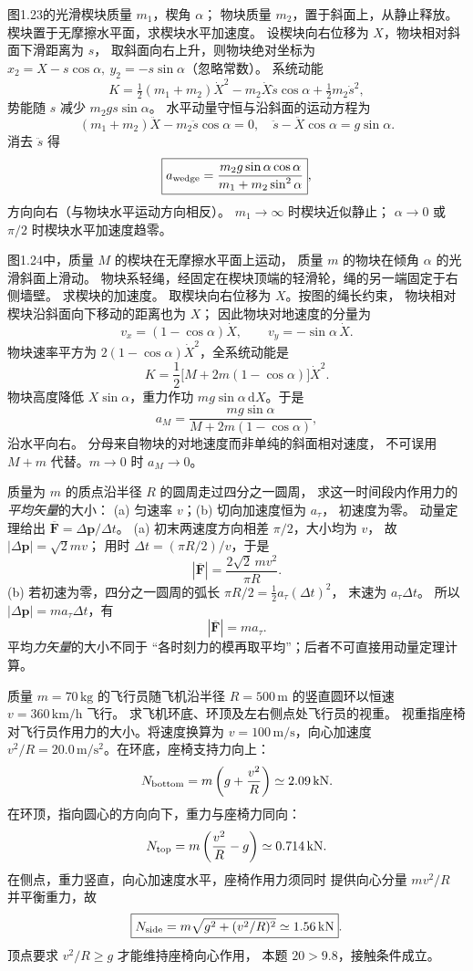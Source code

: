 图1.23的光滑楔块质量 $m_1$，楔角 $\alpha$；
物块质量 $m_2$，置于斜面上，从静止释放。
楔块置于无摩擦水平面，求楔块水平加速度。
\exsolution
设楔块向右位移为 $X$，物块相对斜面下滑距离为 $s$，
取斜面向右上升，则物块绝对坐标为
$x_2=X-s\cos\alpha,\ y_2=-s\sin\alpha$（忽略常数）。
系统动能
\[
K=\tfrac12(m_1+m_2)\dot X^2
-m_2\dot X\dot s\cos\alpha+\tfrac12m_2\dot s^2,
\]
势能随 $s$ 减少 $m_2gs\sin\alpha$。
水平动量守恒与沿斜面的运动方程为
\[
(m_1+m_2)\ddot X-m_2\ddot s\cos\alpha=0,\quad
\ddot s-\ddot X\cos\alpha=g\sin\alpha.
\]
消去 $\ddot s$ 得
\[
\boxed{a_{\rm wedge}=
\frac{m_2g\sin\alpha\cos\alpha}
{m_1+m_2\sin^2\alpha}},
\]
方向向右（与物块水平运动方向相反）。
\excheck $m_1\to\infty$ 时楔块近似静止；
$\alpha\to0$ 或 $\pi/2$ 时楔块水平加速度趋零。

图1.24中，质量 $M$ 的楔块在无摩擦水平面上运动，
质量 $m$ 的物块在倾角 $\alpha$ 的光滑斜面上滑动。
物块系轻绳，经固定在楔块顶端的轻滑轮，绳的另一端固定于右侧墙壁。
求楔块的加速度。
\exsolution
取楔块向右位移为 $X$。按图的绳长约束，
物块相对楔块沿斜面向下移动的距离也为 $X$；
因此物块对地速度的分量为
\[
v_x=(1-\cos\alpha)\dot X,\qquad
v_y=-\sin\alpha\,\dot X.
\]
物块速率平方为
$2(1-\cos\alpha)\dot X^2$，全系统动能是
\[
K=\frac12\bigl[M+2m(1-\cos\alpha)\bigr]\dot X^2.
\]
物块高度降低 $X\sin\alpha$，重力作功
$mg\sin\alpha\,\mathrm dX$。于是
\[
\boxed{a_M=
\frac{mg\sin\alpha}
{M+2m(1-\cos\alpha)}},
\]
沿水平向右。
\excheck 分母来自物块的对地速度而非单纯的斜面相对速度，
不可误用 $M+m$ 代替。$m\to0$ 时 $a_M\to0$。

质量为 $m$ 的质点沿半径 $R$ 的圆周走过四分之一圆周，
求这一时间段内作用力的\emph{平均矢量}的大小：
(a) 匀速率 $v$；(b) 切向加速度恒为 $a_\tau$，
初速度为零。
\exsolution
动量定理给出 $\overline{\bm F}=\Delta\bm p/\Delta t$。
(a) 初末两速度方向相差 $\pi/2$，大小均为 $v$，
故 $|\Delta\bm p|=\sqrt2mv$；
用时 $\Delta t=(\pi R/2)/v$，于是
\[
\boxed{|\overline{\bm F}|=\frac{2\sqrt2\,mv^2}{\pi R}}.
\]
(b) 若初速为零，四分之一圆周的弧长
$\pi R/2=\tfrac12a_\tau(\Delta t)^2$，
末速为 $a_\tau\Delta t$。
所以 $|\Delta\bm p|=ma_\tau\Delta t$，有
\[
\boxed{|\overline{\bm F}|=ma_\tau}.
\]
\excheck 平均\emph{力矢量}的大小不同于
“各时刻力的模再取平均”；后者不可直接用动量定理计算。

质量 $m=70\,\mathrm{kg}$ 的飞行员随飞机沿半径
$R=500\,\mathrm m$ 的竖直圆环以恒速
$v=360\,\mathrm{km/h}$ 飞行。
求飞机环底、环顶及左右侧点处飞行员的视重。
\exsolution
视重指座椅对飞行员作用力的大小。将速度换算为
$v=100\,\mathrm{m/s}$，向心加速度
$v^2/R=20.0\,\mathrm{m/s^2}$。在环底，座椅支持力向上：
\[
N_{\rm bottom}=m\left(g+\frac{v^2}{R}\right)
\simeq2.09\,\mathrm{kN}.
\]
在环顶，指向圆心的方向向下，重力与座椅力同向：
\[
N_{\rm top}=m\left(\frac{v^2}{R}-g\right)
\simeq0.714\,\mathrm{kN}.
\]
在侧点，重力竖直，向心加速度水平，座椅作用力须同时
提供向心分量 $mv^2/R$ 并平衡重力，故
\[
\boxed{N_{\rm side}=
m\sqrt{g^2+(v^2/R)^2}\simeq1.56\,\mathrm{kN}}.
\]
\excheck 顶点要求 $v^2/R\ge g$ 才能维持座椅向心作用，
本题 $20>9.8$，接触条件成立。

